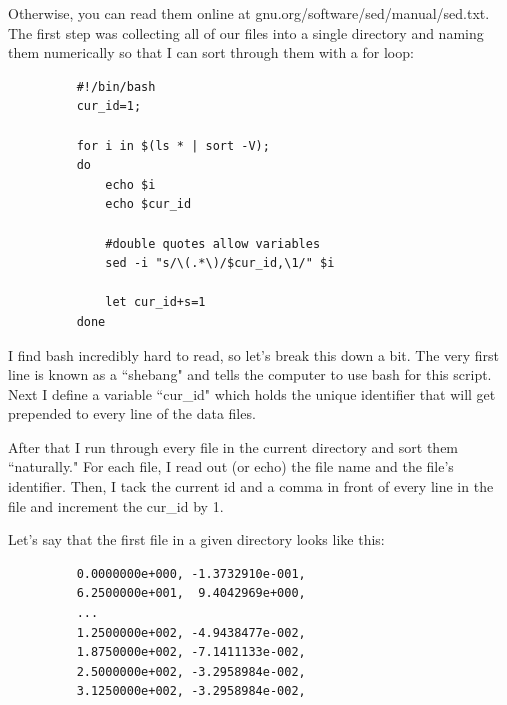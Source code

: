\documentclass{article}
\begin{document}
Otherwise, you can read them online at gnu.org/software/sed/manual/sed.txt. The
first step was collecting all of our files into a single directory and naming
them numerically so that I can sort through them with a for loop:

\begin{figure}[thp]
\centering
\begin{minipage}{.8\textwidth}
\begin{tcolorbox}
\begin{verbatim}
    #!/bin/bash
    cur_id=1;

    for i in $(ls * | sort -V);
    do
        echo $i
        echo $cur_id

        #double quotes allow variables
        sed -i "s/\(.*\)/$cur_id,\1/" $i

        let cur_id+s=1
    done
\end{verbatim}
\end{tcolorbox}
\end{minipage}
\end{figure}

I find bash incredibly hard to read, so let's break this down a bit. The very
first line is known as a ``shebang" and tells the computer to use bash for this
script. Next I define a variable ``cur\_id" which holds the unique
identifier that will get prepended to every line of the data files.

After that I run through every file in the current directory and sort them
``naturally." For each file, I read out (or echo) the file name and the file's
identifier. Then, I tack the current id and a comma in front of every line in
the file and increment the cur\_id by 1.

Let's say that the first file in a given directory looks like this:
\begin{figure}[thp]
\centering
\begin{minipage}{.8\textwidth}
\begin{tcolorbox}
\begin{verbatim} 
    0.0000000e+000, -1.3732910e-001,
    6.2500000e+001,  9.4042969e+000,
    ...
    1.2500000e+002, -4.9438477e-002,
    1.8750000e+002, -7.1411133e-002,
    2.5000000e+002, -3.2958984e-002,
    3.1250000e+002, -3.2958984e-002,
\end{verbatim}
\end{tcolorbox}
\end{minipage}
\end{figure}
\end{document}
